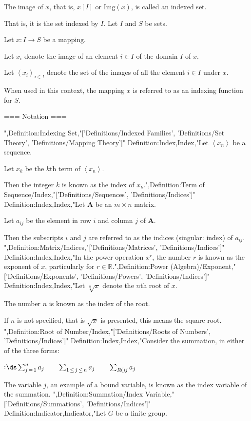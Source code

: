 The image of $x$, that is, $x \left[ I \right]$ or $\mathrm {Img} \left( x \right)$, is called an indexed set.

That is, it is the set indexed by $I$.
Let $I$ and $S$ be sets.

Let $x: I \to S$ be a mapping.

Let $x_i$ denote the image of an element $i \in I$ of the domain $I$ of $x$.

Let $\left\langle x_i \right\rangle_{i \mathop \in I}$ denote the set of the images of all the element $i \in I$ under $x$.


When used in this context, the mapping $x$ is referred to as an indexing function for $S$.


=== Notation ===

",Definition:Indexing Set,"['Definitions/Indexed Families', 'Definitions/Set Theory', 'Definitions/Mapping Theory']"
Definition:Index,Index,"Let $\left\langle x_n \right\rangle$ be a sequence.

Let $x_k$ be the $k$th term of $\left\langle x_n \right\rangle$.

Then the integer $k$ is known as the index of $x_k$.",Definition:Term of Sequence/Index,"['Definitions/Sequences', 'Definitions/Indices']"
Definition:Index,Index,"Let $\mathbf A$ be an $m \times n$ matrix.

Let $a_{i j}$ be the element in row $i$ and column $j$ of $\mathbf A$.


Then the subscripts $i$ and $j$ are referred to as the indices (singular: index) of $a_{i j}$.
",Definition:Matrix/Indices,"['Definitions/Matrices', 'Definitions/Indices']"
Definition:Index,Index,"In the power operation $x^r$, the number $r$ is known as the exponent of $x$, particularly for $r \in \mathbb R$.",Definition:Power (Algebra)/Exponent,"['Definitions/Exponents', 'Definitions/Powers', 'Definitions/Indices']"
Definition:Index,Index,"Let $\sqrt [n] x$ denote the $n$th root of $x$.

The number $n$ is known as the index of the root.


If $n$ is not specified, that is $\sqrt x$ is presented, this means the square root.
",Definition:Root of Number/Index,"['Definitions/Roots of Numbers', 'Definitions/Indices']"
Definition:Index,Index,"Consider the summation, in either of the three forms:

:$\ds \sum_{j \mathop = 1}^n a_j \qquad \sum_{1 \mathop \le j \mathop \le n} a_j \qquad \sum_{R \left(   \right)j} a_j$


The variable $j$, an example of a bound variable, is known as the index variable of the summation.
",Definition:Summation/Index Variable,"['Definitions/Summations', 'Definitions/Indices']"
Definition:Indicator,Indicator,"Let $G$ be a finite group.

